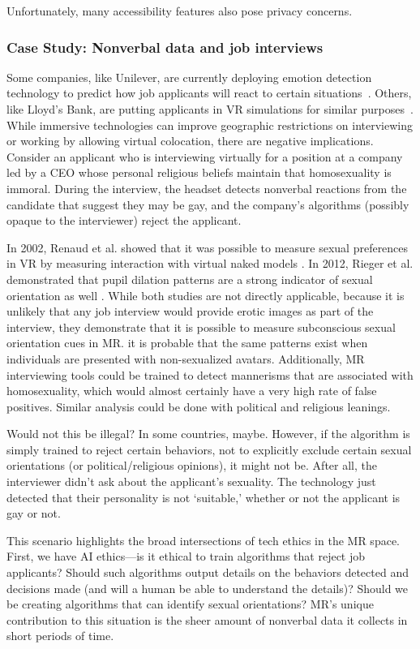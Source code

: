 Unfortunately, many accessibility features also pose privacy concerns.

\subsubsection{Case Study: Nonverbal data and job interviews}
Some companies, like Unilever, are currently deploying emotion detection technology to predict how job applicants will react to certain situations~\cite{gilliland}. Others, like Lloyd's Bank, are putting applicants in VR simulations for similar purposes~\cite{guardian2018how}. While immersive technologies can improve geographic restrictions on interviewing or working by allowing virtual colocation, there are negative implications. Consider an applicant who is interviewing virtually for a position at a company led by a CEO whose personal religious beliefs maintain that homosexuality is immoral. During the interview, the headset detects nonverbal reactions from the candidate that suggest they may be gay, and the company's algorithms (possibly opaque to the interviewer) reject the applicant.

In 2002, Renaud et al. showed that it was possible to measure sexual preferences in VR by measuring interaction with virtual naked models \cite{renaud}. In 2012, Rieger et al. demonstrated that pupil dilation patterns are a strong indicator of sexual orientation as well \cite{rieger}. While both studies are not directly applicable, because it is unlikely that any job interview would provide erotic images as part of the interview, they demonstrate that it is possible to measure subconscious sexual orientation cues in MR. it is probable that the same patterns exist when individuals are presented with non-sexualized avatars. Additionally, MR interviewing tools could be trained to detect mannerisms that are associated with homosexuality, which would almost certainly have a very high rate of false positives. Similar analysis could be done with political and religious leanings.

Would not this be illegal? In some countries, maybe. However, if the algorithm is simply trained to reject certain behaviors, not to explicitly exclude certain sexual orientations (or political/religious opinions), it might not be. After all, the interviewer didn't ask about the applicant's sexuality. The technology just detected that their personality is not `suitable,' whether or not the applicant is gay or not.

This scenario highlights the broad intersections of tech ethics in the MR space. First, we have AI ethics---is it ethical to train algorithms that reject job applicants? Should such algorithms output details on the behaviors detected and decisions made (and will a human be able to understand the details)? Should we be creating algorithms that can identify sexual orientations? MR's unique contribution to this situation is the sheer amount of nonverbal data it collects in short periods of time.

